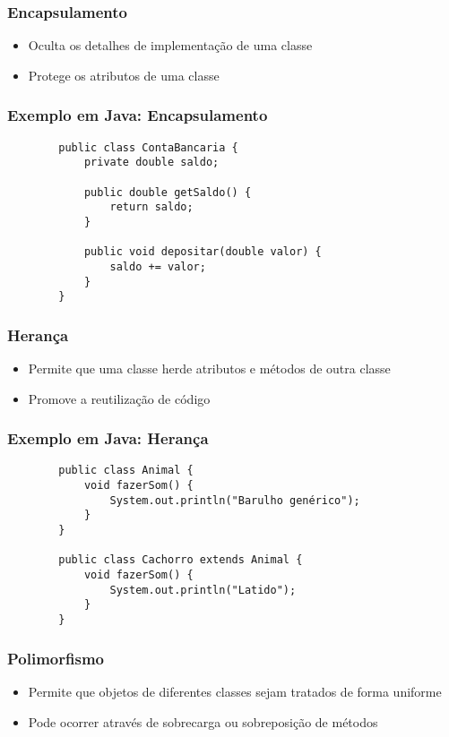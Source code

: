 \begin{frame}
	\frametitle{Encapsulamento}
	\begin{itemize}
		\item Oculta os detalhes de implementação de uma classe
		\item Protege os atributos de uma classe
	\end{itemize}
\end{frame}

\begin{frame}[fragile]
	\frametitle{Exemplo em Java: Encapsulamento}
	\begin{verbatim}
		public class ContaBancaria {
			private double saldo;
			
			public double getSaldo() {
				return saldo;
			}
			
			public void depositar(double valor) {
				saldo += valor;
			}
		}
	\end{verbatim}
\end{frame}

\begin{frame}
	\frametitle{Herança}
	\begin{itemize}
		\item Permite que uma classe herde atributos e métodos de outra classe
		\item Promove a reutilização de código
	\end{itemize}
\end{frame}

\begin{frame}[fragile]
	\frametitle{Exemplo em Java: Herança}
	\begin{verbatim}
		public class Animal {
			void fazerSom() {
				System.out.println("Barulho genérico");
			}
		}
		
		public class Cachorro extends Animal {
			void fazerSom() {
				System.out.println("Latido");
			}
		}
	\end{verbatim}
\end{frame}

\begin{frame}
	\frametitle{Polimorfismo}
	\begin{itemize}
		\item Permite que objetos de diferentes classes sejam tratados de forma uniforme
		\item Pode ocorrer através de sobrecarga ou sobreposição de métodos
	\end{itemize}
\end{frame}

